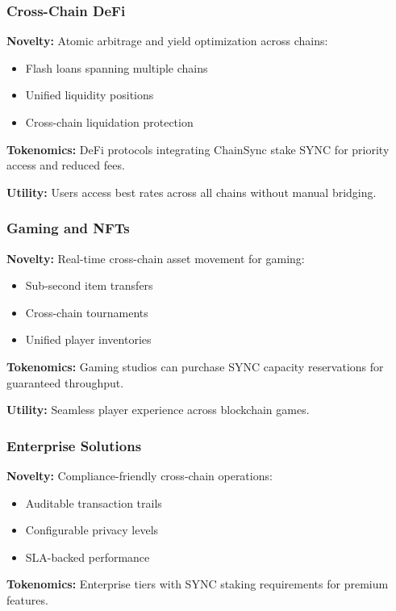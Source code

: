 \documentclass[12pt,a4paper]{article}
\begin{document}
\subsubsection{Cross-Chain DeFi}

\textbf{Novelty:} Atomic arbitrage and yield optimization across chains:
\begin{itemize}
    \item Flash loans spanning multiple chains
    \item Unified liquidity positions
    \item Cross-chain liquidation protection
\end{itemize}

\textbf{Tokenomics:} DeFi protocols integrating ChainSync stake SYNC for priority access and reduced fees.

\textbf{Utility:} Users access best rates across all chains without manual bridging.

\subsubsection{Gaming and NFTs}

\textbf{Novelty:} Real-time cross-chain asset movement for gaming:
\begin{itemize}
    \item Sub-second item transfers
    \item Cross-chain tournaments
    \item Unified player inventories
\end{itemize}

\textbf{Tokenomics:} Gaming studios can purchase SYNC capacity reservations for guaranteed throughput.

\textbf{Utility:} Seamless player experience across blockchain games.

\subsubsection{Enterprise Solutions}

\textbf{Novelty:} Compliance-friendly cross-chain operations:
\begin{itemize}
    \item Auditable transaction trails
    \item Configurable privacy levels
    \item SLA-backed performance
\end{itemize}

\textbf{Tokenomics:} Enterprise tiers with SYNC staking requirements for premium features.
\end{document}
